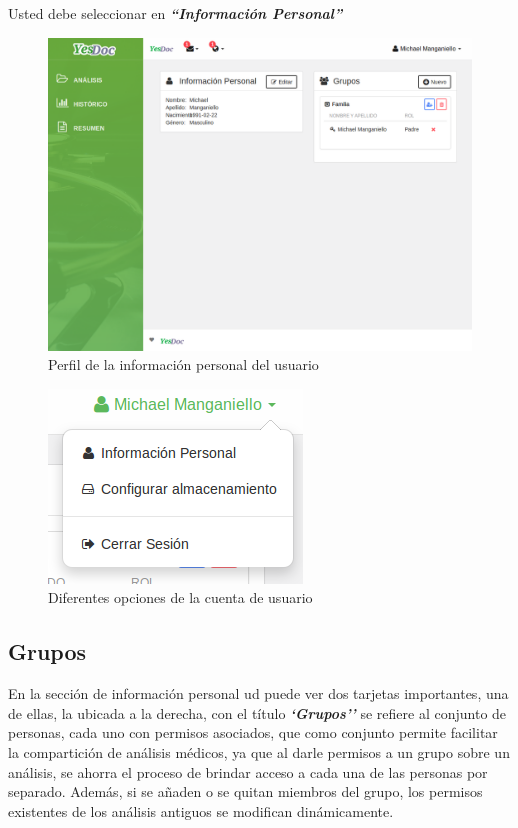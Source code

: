  Usted debe seleccionar en \textbf{\textit{``Información Personal''}}
  \begin{figure}
  	\centering
  	\includegraphics[width=.8\textwidth]{img/manual_de_usuario/informacion_personal}
  	\caption{Perfil de la información personal del usuario}
  	\label{mu-informacion_personal}
  \end{figure}
    \begin{figure}
    	\centering
    	\includegraphics[width=.5\textwidth]{img/manual_de_usuario/opcion_usuario}
    	\caption{Diferentes opciones de la cuenta de usuario                                                                                                                                                                                                                                                                                                                                                                                                                                                                                                  }
    	\label{mu-opcion_usuario}
    \end{figure}
    

\subsection{Grupos}    
En la sección de información personal ud puede ver dos tarjetas     importantes, una de ellas, la ubicada a la derecha, con el título \textbf{\textit{`Grupos''}} se refiere al conjunto de personas, cada uno con permisos asociados, que como conjunto permite facilitar la compartición de análisis médicos, ya que al darle permisos a un grupo sobre un análisis, se ahorra el proceso de brindar acceso a cada una de las personas por separado. Además, si se añaden o se quitan miembros del grupo, los permisos existentes de los análisis antiguos se modifican dinámicamente.

